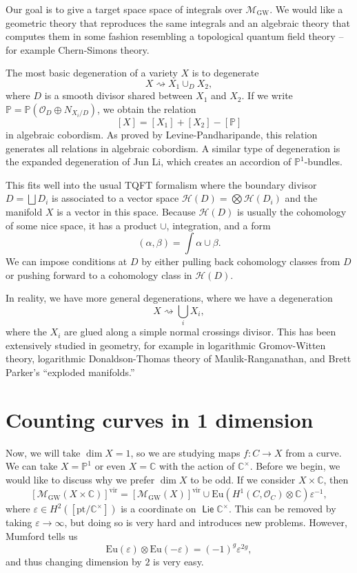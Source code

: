 \documentclass[leqno, openany]{memoir}
\theoremstyle{definition}
\theoremstyle{remark}
\theoremstyle{plain}
\theoremstyle{definition}
\theoremstyle{remark}
\newcommand{\C}{\mathbb{C}}
\renewcommand{\P}{\mathbb{P}}
\newcommand{\ep}{\varepsilon}
\newcommand{\mc}[1]{\mathcal{#1}}
\newcommand{\mr}[1]{\mathrm{#1}}
\newcommand{\ms}[1]{\mathsf{#1}}
\newcommand{\on}[1]{\operatorname{#1}}
\begin{document}
Our goal is to give a target space space of integrals over $\mc{M}_{\mr{GW}}$. We would like a geometric theory that reproduces the same integrals and an algebraic theory that computes them in some fashion resembling a topological quantum field theory -- for example Chern-Simons theory.

The most basic degeneration of a variety $X$ is to degenerate 
\[ X \rightsquigarrow X_1 \cup_D X_2, \] 
where $D$ is a smooth divisor shared between $X_1$ and $X_2$. If we write $\P = \P(\mc{O}_D \oplus N_{X_i/D})$, we obtain the relation
\[ [X] = [X_1] + [X_2] - [\P] \]
in algebraic cobordism. As proved by Levine-Pandharipande, this relation generates all relations in algebraic cobordism. A similar type of degeneration is the expanded degeneration of Jun Li, which creates an accordion of $\P^1$-bundles.

This fits well into the usual TQFT formalism where the boundary divisor $D = \bigsqcup D_i$ is associated to a vector space $\mc{H}(D) = \bigotimes \mc{H}(D_i)$ and the manifold $X$ is a vector in this space. Because $\mc{H}(D)$ is usually the cohomology of some nice space, it has a product $\cup$, integration, and a form
\[ (\alpha, \beta) = \int \alpha \cup \beta. \]
We can impose conditions at $D$ by either pulling back cohomology classes from $D$ or pushing forward to a cohomology class in $\mc{H}(D)$.

In reality, we have more general degenerations, where we have a degeneration
\[ X \rightsquigarrow \bigcup_i X_i, \]
where the $X_i$ are glued along a simple normal crossings divisor. This has been extensively studied in geometry, for example in logarithmic Gromov-Witten theory, logarithmic Donaldson-Thomas theory of Maulik-Ranganathan, and Brett Parker's ``exploded manifolds.''

\section{Counting curves in 1 dimension}

Now, we will take $\dim X = 1$, so we are studying maps $f \colon C \to X$ from a curve. We can take $X = \P^1$ or even $X = \C$ with the action of $\C^{\times}$. Before we begin, we would like to discuss why we prefer $\dim X$ to be odd. If we consider $X \times \C$, then
\[ [\mc{M}_{\mr{GW}}(X \times \C)]^{\mr{vir}} = [\mc{M}_{\mr{GW}}(X)]^{\mr{vir}} \cup \mr{Eu}(H^1(C, \mc{O}_C) \otimes \C) \ep^{-1}, \] 
where $\ep \in H^2([\mr{pt}/\C^{\times}])$ is a coordinate on $\on{\ms{Lie}} \C^{\times}$. This can be removed by taking $\ep \to \infty$, but doing so is very hard and introduces new problems. However, Mumford tells us
\[ \mr{Eu}(\ep) \otimes \mr{Eu}(-\ep) = (-1)^g \ep^{2g}, \]
and thus changing dimension by $2$ is very easy.
\end{document}
